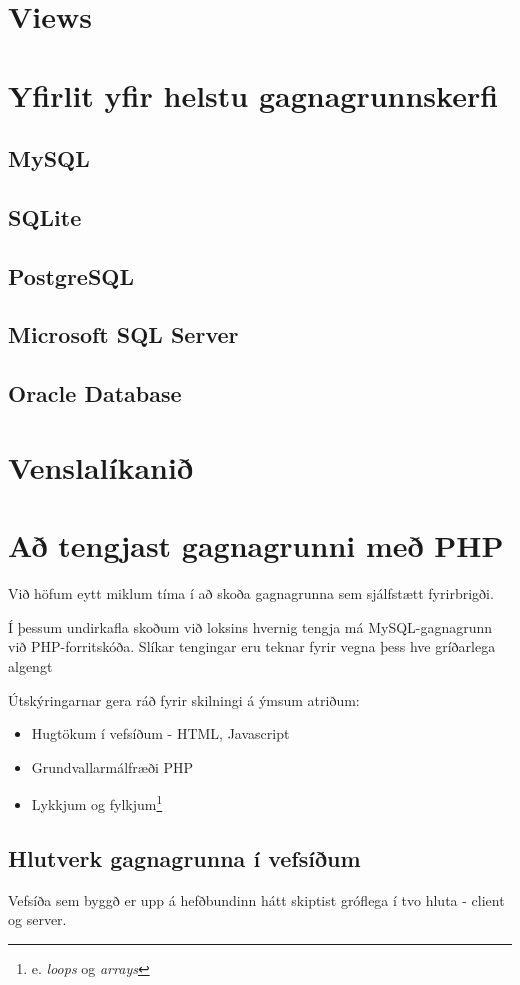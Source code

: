 \section{Views}
\section{Yfirlit yfir helstu gagnagrunnskerfi}
\subsection{MySQL}
\subsection{SQLite}
\subsection{PostgreSQL}
\subsection{Microsoft SQL Server}
\subsection{Oracle Database}
\section{Venslalíkanið}
\section{Að tengjast gagnagrunni með PHP}
Við höfum eytt miklum tíma í að skoða gagnagrunna sem sjálfstætt fyrirbrigði.

Í þessum undirkafla skoðum við loksins hvernig tengja má MySQL-gagnagrunn við PHP-forritskóða.
Slíkar tengingar eru teknar fyrir vegna þess hve gríðarlega algengt 

Útskýringarnar gera ráð fyrir skilningi á ýmsum atriðum:
\begin{itemize}
 \item Hugtökum í vefsíðum - HTML, Javascript
 \item Grundvallarmálfræði PHP
 \item Lykkjum og fylkjum\footnote{e. \emph{loops} og \emph{arrays}}
\end{itemize}
\subsection{Hlutverk gagnagrunna í vefsíðum}
Vefsíða sem byggð er upp á hefðbundinn hátt skiptist gróflega í tvo hluta - client og server. 

